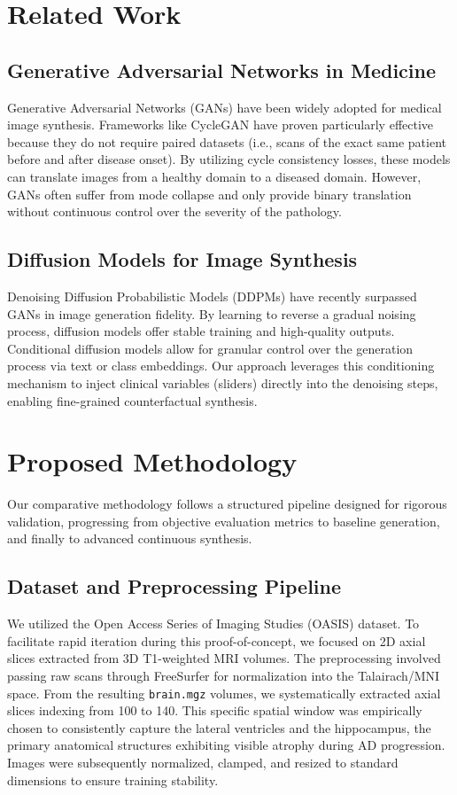\documentclass[conference]{IEEEtran}
\begin{document}
\section{Related Work}
\subsection{Generative Adversarial Networks in Medicine}
Generative Adversarial Networks (GANs) have been widely adopted for medical image synthesis. Frameworks like CycleGAN have proven particularly effective because they do not require paired datasets (i.e., scans of the exact same patient before and after disease onset). By utilizing cycle consistency losses, these models can translate images from a healthy domain to a diseased domain. However, GANs often suffer from mode collapse and only provide binary translation without continuous control over the severity of the pathology.

\subsection{Diffusion Models for Image Synthesis}
Denoising Diffusion Probabilistic Models (DDPMs) have recently surpassed GANs in image generation fidelity. By learning to reverse a gradual noising process, diffusion models offer stable training and high-quality outputs. Conditional diffusion models allow for granular control over the generation process via text or class embeddings. Our approach leverages this conditioning mechanism to inject clinical variables (sliders) directly into the denoising steps, enabling fine-grained counterfactual synthesis.

\section{Proposed Methodology}
Our comparative methodology follows a structured pipeline designed for rigorous validation, progressing from objective evaluation metrics to baseline generation, and finally to advanced continuous synthesis.

\subsection{Dataset and Preprocessing Pipeline}
We utilized the Open Access Series of Imaging Studies (OASIS) dataset. To facilitate rapid iteration during this proof-of-concept, we focused on 2D axial slices extracted from 3D T1-weighted MRI volumes.
The preprocessing involved passing raw scans through FreeSurfer for normalization into the Talairach/MNI space. From the resulting \texttt{brain.mgz} volumes, we systematically extracted axial slices indexing from 100 to 140. This specific spatial window was empirically chosen to consistently capture the lateral ventricles and the hippocampus, the primary anatomical structures exhibiting visible atrophy during AD progression. Images were subsequently normalized, clamped, and resized to standard dimensions to ensure training stability.
\end{document}
